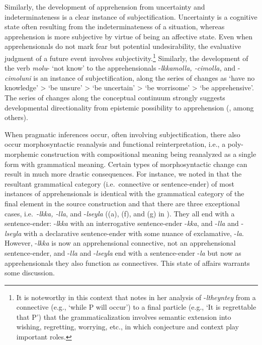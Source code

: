 \documentclass[output=paper,colorlinks,citecolor=brown]{langscibook}
\begin{document}
Similarly, the development of apprehension from uncertainty and indeterminateness is a clear instance of subjectification. Uncertainty is a cognitive state often resulting from the indeterminateness of a situation, whereas apprehension is more subjective by virtue of being an affective state. Even when apprehensionals do not mark fear but potential undesirability, the evaluative judgment of a future event involves subjectivity.\footnote{It is noteworthy in this context that \citet{Kim2021} notes in her analysis of \nobreakdash-\textit{ltheyntey} from a connective (e.g., `while P will occur') to a final particle (e.g., `It is regrettable that P') that the grammaticalization involves semantic extension into wishing, regretting, worrying, etc., in which conjecture and context play important roles.} Similarly, the development of the verb \textit{molu}- `not know' to the apprehensionals \nobreakdash-\textit{lkkamolla, -cimolla,} and \nobreakdash-\textit{cimoluni} is an instance of subjectification, along the series of changes as `have no knowledge' > `be unsure' > `be uncertain' > `be worrisome' > `be apprehensive'. The series of changes along the conceptual continuum strongly suggests developmental directionality from epistemic possibility to apprehension (\citealt{Dobrushina2006,pakendorfschalley2007}, among others).

When pragmatic inferences occur, often involving subjectification, there also occur morphosyntactic reanalysis and functional reinterpretation, i.e., a poly-morphemic construction with compositional meaning being reanalyzed as a single form with grammatical meaning. Certain types of morphosyntactic change can result in much more drastic consequences. For instance, we noted in  that the resultant grammatical category (i.e.\  connective or sentence-ender) of most instances of apprehensionals is identical with the grammatical category of the final element in the source construction and that there are three exceptional cases, i.e.\  \nobreakdash-\textit{lkka, -lla}, and \nobreakdash-\textit{lseyla} ((a), (f), and (g) in ). They all end with a sentence-ender: \nobreakdash-\textit{lkka} with an interrogative sentence-ender \nobreakdash-\textit{kka}, and \nobreakdash-\textit{lla} and \nobreakdash-\textit{lseyla} with a declarative sentence-ender with some nuance of exclamative, \nobreakdash-\textit{la}. However, \nobreakdash-\textit{lkka} is now an apprehensional connective, not an apprehensional sentence-ender, and \nobreakdash-\textit{lla} and \nobreakdash-\textit{lseyla} end with a sentence-ender \nobreakdash-\textit{la} but now as apprehensionals they also function as connectives. This state of affairs warrants some discussion.
\end{document}
